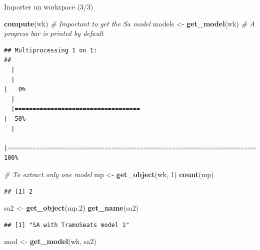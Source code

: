 \documentclass[10pt,xcolor=table,color={dvipsnames,usenames},ignorenonframetext,usepdftitle=false,french]{beamer}
\newenvironment{Shaded}{\begin{snugshade}}{\end{snugshade}}
\newcommand{\CommentTok}[1]{\textcolor[rgb]{0.56,0.35,0.01}{\textit{#1}}}
\newcommand{\DecValTok}[1]{\textcolor[rgb]{0.00,0.00,0.81}{#1}}
\newcommand{\KeywordTok}[1]{\textcolor[rgb]{0.13,0.29,0.53}{\textbf{#1}}}
\newcommand{\NormalTok}[1]{#1}
\newcommand{\StringTok}[1]{\textcolor[rgb]{0.31,0.60,0.02}{#1}}
\begin{document}
\begin{frame}[fragile]{Importer un workspace (3/3)}
\protect\hypertarget{importer-un-workspace-33}{}

\footnotesize

\begin{Shaded}
\begin{Highlighting}[]
\KeywordTok{compute}\NormalTok{(wk) }\CommentTok{# Important to get the Sa model}
\NormalTok{models <-}\StringTok{ }\KeywordTok{get_model}\NormalTok{(wk) }\CommentTok{# A progress bar is printed by default}
\end{Highlighting}
\end{Shaded}

\begin{verbatim}
## Multiprocessing 1 on 1:
## 
  |                                                                            
  |                                                                      |   0%
  |                                                                            
  |===================================                                   |  50%
  |                                                                            
  |======================================================================| 100%
\end{verbatim}

\begin{Shaded}
\begin{Highlighting}[]
\CommentTok{# To extract only one model}
\NormalTok{mp <-}\StringTok{ }\KeywordTok{get_object}\NormalTok{(wk, }\DecValTok{1}\NormalTok{)}
\KeywordTok{count}\NormalTok{(mp)}
\end{Highlighting}
\end{Shaded}

\begin{verbatim}
## [1] 2
\end{verbatim}

\begin{Shaded}
\begin{Highlighting}[]
\NormalTok{sa2 <-}\StringTok{ }\KeywordTok{get_object}\NormalTok{(mp,}\DecValTok{2}\NormalTok{)}
\KeywordTok{get_name}\NormalTok{(sa2)}
\end{Highlighting}
\end{Shaded}

\begin{verbatim}
## [1] "SA with TramoSeats model 1"
\end{verbatim}

\begin{Shaded}
\begin{Highlighting}[]
\NormalTok{mod <-}\StringTok{ }\KeywordTok{get_model}\NormalTok{(wk, sa2)}
\end{Highlighting}
\end{Shaded}


\end{frame}
\end{document}
